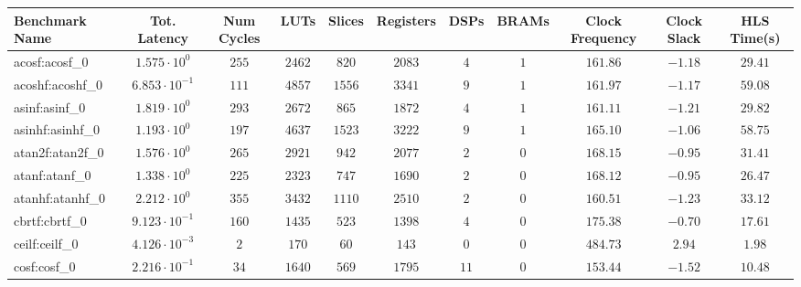 \begin{tabular}{|l|c|c|c|c|c|c|c|c|c|c|}
\hline
Benchmark Name               & Tot. Latency            & Num Cycles & LUTs      & Slices    & Registers & DSPs    & BRAMs & Clock Frequency & Clock Slack & HLS Time(s) \\
\hline
acosf:acosf\_0               & $ 1.575 \cdot 10^{0}  $ & $ 255    $ & $ 2462  $ & $ 820   $ & $ 2083  $ & $ 4   $ & $ 1 $ & $ 161.86      $ & $ -1.18   $ & $ 29.41   $ \\
acoshf:acoshf\_0             & $ 6.853 \cdot 10^{-1} $ & $ 111    $ & $ 4857  $ & $ 1556  $ & $ 3341  $ & $ 9   $ & $ 1 $ & $ 161.97      $ & $ -1.17   $ & $ 59.08   $ \\
asinf:asinf\_0               & $ 1.819 \cdot 10^{0}  $ & $ 293    $ & $ 2672  $ & $ 865   $ & $ 1872  $ & $ 4   $ & $ 1 $ & $ 161.11      $ & $ -1.21   $ & $ 29.82   $ \\
asinhf:asinhf\_0             & $ 1.193 \cdot 10^{0}  $ & $ 197    $ & $ 4637  $ & $ 1523  $ & $ 3222  $ & $ 9   $ & $ 1 $ & $ 165.10      $ & $ -1.06   $ & $ 58.75   $ \\
atan2f:atan2f\_0             & $ 1.576 \cdot 10^{0}  $ & $ 265    $ & $ 2921  $ & $ 942   $ & $ 2077  $ & $ 2   $ & $ 0 $ & $ 168.15      $ & $ -0.95   $ & $ 31.41   $ \\
atanf:atanf\_0               & $ 1.338 \cdot 10^{0}  $ & $ 225    $ & $ 2323  $ & $ 747   $ & $ 1690  $ & $ 2   $ & $ 0 $ & $ 168.12      $ & $ -0.95   $ & $ 26.47   $ \\
atanhf:atanhf\_0             & $ 2.212 \cdot 10^{0}  $ & $ 355    $ & $ 3432  $ & $ 1110  $ & $ 2510  $ & $ 2   $ & $ 0 $ & $ 160.51      $ & $ -1.23   $ & $ 33.12   $ \\
cbrtf:cbrtf\_0               & $ 9.123 \cdot 10^{-1} $ & $ 160    $ & $ 1435  $ & $ 523   $ & $ 1398  $ & $ 4   $ & $ 0 $ & $ 175.38      $ & $ -0.70   $ & $ 17.61   $ \\
ceilf:ceilf\_0               & $ 4.126 \cdot 10^{-3} $ & $ 2      $ & $ 170   $ & $ 60    $ & $ 143   $ & $ 0   $ & $ 0 $ & $ 484.73      $ & $ 2.94    $ & $ 1.98    $ \\
cosf:cosf\_0                 & $ 2.216 \cdot 10^{-1} $ & $ 34     $ & $ 1640  $ & $ 569   $ & $ 1795  $ & $ 11  $ & $ 0 $ & $ 153.44      $ & $ -1.52   $ & $ 10.48   $ \\

\end{tabular}
